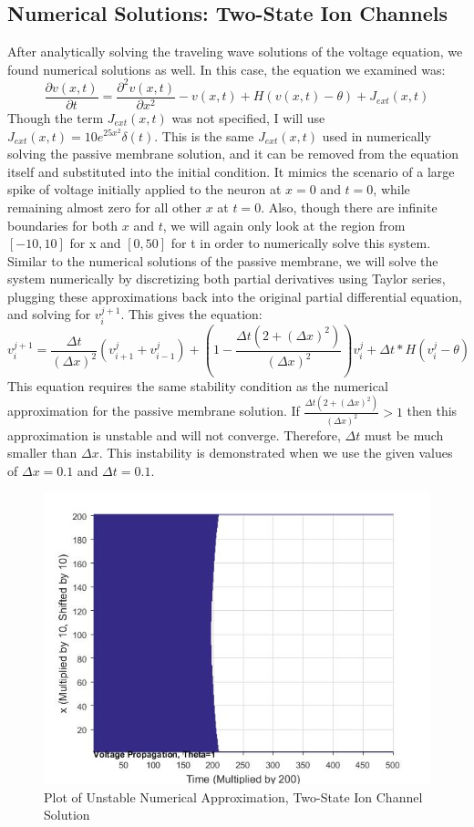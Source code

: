 \documentclass[12pt]{article}
\begin{document}
\subsection{Numerical Solutions: Two-State Ion Channels}
After analytically solving the traveling wave solutions of the voltage equation, we found numerical solutions as well. In this case, the equation we examined was:
\[\frac{\partial{v(x,t)}}{\partial{t}}=\frac{\partial^2{v(x,t)}}{\partial{x}^2}-v(x,t)+H(v(x,t)-\theta)+J_{ext}(x,t)\]
Though the term $J_{ext}(x,t)$ was not specified, I will use $J_{ext}(x,t)=10e^{25x^2}\delta(t)$. This is the same $J_{ext}(x,t)$ used in numerically solving the passive membrane solution, and it can be removed from the equation itself and substituted into the initial condition. It mimics the scenario of a large spike of voltage initially applied to the neuron at $x=0$ and $t=0$, while remaining almost zero for all other $x$ at $t=0$. Also, though there are infinite boundaries for both $x$ and $t$, we will again only look at the region from $[-10,10]$ for x and $[0,50]$ for t in order to numerically solve this system.  Similar to the numerical solutions of the passive membrane, we will solve the system numerically by discretizing both partial derivatives using Taylor series, plugging these approximations back into the original partial differential equation, and solving for $v^{j+1}_i$. This gives the equation:
\begin{equation} \label{**}
v^{j+1}_i=\frac{\Delta{t}}{(\Delta{x})^2}(v^{j}_{i+1}+v^{j}_{i-1})+(1-\frac{\Delta{t}(2+(\Delta{x})^2)}{(\Delta{x})^2})v^{j}_{i}+\Delta{t}*H(v^j_i-\theta)
\end {equation}
This equation requires the same stability condition as the numerical approximation for the passive membrane solution. If $\frac{\Delta{t}(2+(\Delta{x})^2)}{(\Delta{x})^2}>1$ then this approximation is unstable and will not converge. Therefore, $\Delta{t}$ must be much smaller than $\Delta{x}$. This instability is demonstrated when we use the given values of $\Delta{x}=0.1$ and $\Delta{t}=0.1$. 
\begin{figure}[H]
  \includegraphics[width=\linewidth]{badplot3.jpg}
  \caption{Plot of Unstable Numerical Approximation, Two-State Ion Channel Solution}
  \label{fig:sketch3}
\end{figure}
\end{document}
